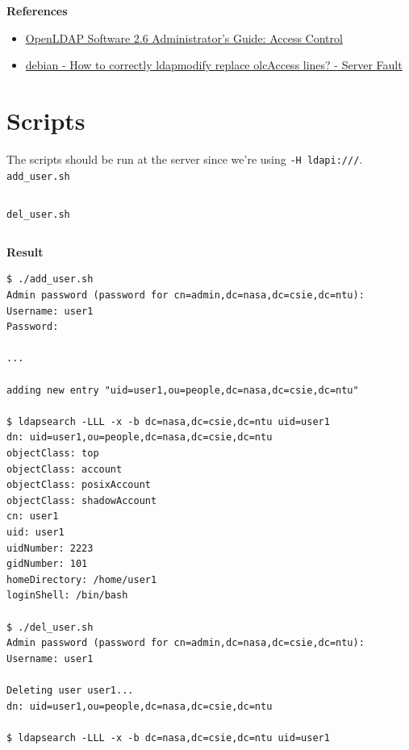 \documentclass[12pt, a4paper]{article}
\begin{document}
  \textbf{References}
  \begin{itemize}
    \item \href{https://www.openldap.org/doc/admin26/access-control.html}{OpenLDAP Software 2.6 Administrator's Guide: Access Control}
    \item \href{https://serverfault.com/questions/537737/how-to-correctly-ldapmodify-replace-olcaccess-lines}{debian - How to correctly ldapmodify replace olcAccess lines? - Server Fault}
  \end{itemize}

  \pagebreak
  \section{Scripts}

  The scripts should be run at the server since we're using \verb|-H ldapi:///|.\\

  \verb|add_user.sh|
  \inputminted[fontsize=\footnotesize]{shell}{scripts/add_user.sh}

  \pagebreak
  \verb|del_user.sh|
  \inputminted[fontsize=\footnotesize]{shell}{scripts/del_user.sh}

  \textbf{Result}
  \begin{Verbatim}[frame=single]
$ ./add_user.sh
Admin password (password for cn=admin,dc=nasa,dc=csie,dc=ntu):
Username: user1
Password:

...

adding new entry "uid=user1,ou=people,dc=nasa,dc=csie,dc=ntu"

$ ldapsearch -LLL -x -b dc=nasa,dc=csie,dc=ntu uid=user1
dn: uid=user1,ou=people,dc=nasa,dc=csie,dc=ntu
objectClass: top
objectClass: account
objectClass: posixAccount
objectClass: shadowAccount
cn: user1
uid: user1
uidNumber: 2223
gidNumber: 101
homeDirectory: /home/user1
loginShell: /bin/bash

$ ./del_user.sh
Admin password (password for cn=admin,dc=nasa,dc=csie,dc=ntu):
Username: user1

Deleting user user1...
dn: uid=user1,ou=people,dc=nasa,dc=csie,dc=ntu

$ ldapsearch -LLL -x -b dc=nasa,dc=csie,dc=ntu uid=user1
  \end{Verbatim}
\end{document}
